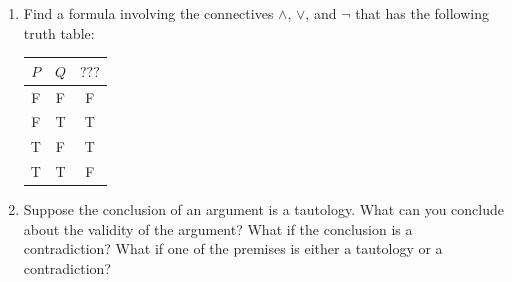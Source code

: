 \begin{enumerate}
\item Find a formula involving the connectives $\land$, $\lor$, and $\neg$ that has the following truth table:
  \begin{center}
    \begin{tabular}{ccc}
      $P$ & $Q$ & $???$ \\
      \midrule
      F & F & F \\
      F & T & T \\
      T & F & T \\
      T & T & F
    \end{tabular}
  \end{center}

\item Suppose the conclusion of an argument is a tautology. What can you conclude about the validity of the argument? What if the conclusion is a contradiction? What if one of the premises is either a tautology or a contradiction?
\end{enumerate}

